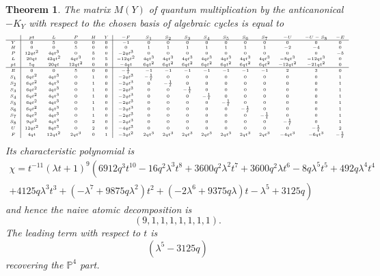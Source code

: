\documentclass[11pt]{amsart}
\theoremstyle{plain}
\newtheorem{theorem}{Theorem}[section]
\numberwithin{equation}{section}
\theoremstyle{definition}
\theoremstyle{remark}
\renewcommand{\P}{\mathbb P}
\begin{document}
\begin{theorem}\label{tTwoQuadricsP6}
The matrix $M(Y)$ of quantum multiplication by the anticanonical $-K_Y$ with respect to the chosen basis of algebraic cycles is equal to
\[
\tiny{
\begin{array}{c|ccccc|ccccccccccc}
&pt&L&P&H& Y &-F&S_{1}&S_{2}&S_{3}&S_{4}&S_{5}&S_{6}&S_{7}&-U&-U-S_{8}&-E \\ 
\hline
      Y &0&5&0&0&0&-1&0&0&0&0&0&0&0&0&0&0\\
      H &0&0&5&0&0&0&1&1&1&1&1&1&1&-2&-4&0\\
      P&12qt^{2}&4qt^{3}&0&5&0&-2qt^{3}&0&0&0&0&0&0&0&0&0&-5\\
      L&20qt&42qt^{2}&4qt^{3}&0&5&-12qt^{2}&4qt^{3}&4qt^{3}&4qt^{3}&4qt^{3}&4qt^{3}&4qt^{3}&4qt^{3}&-8qt^{3}&-12qt^{3}&0\\
      pt & 5q&20qt&12qt^{2}&0&0&-4qt&6qt^{2}&6qt^{2}&6qt^{2}&6qt^{2}&6qt^{2}&6qt^{2}&6qt^{2}&-12qt^{2}&-21qt^{2}&0\\ 
      \hline
      E &0&0&5&0&0&-\frac{1}{t}&-1&-1&-1&-1&-1&-1&-1&2&3&0\\
      S_1&6qt^{2}&4qt^{3}&0&1&0&-2qt^{3}&-\frac{1}{t}&0&0&0&0&0&0&0&0&1\\
      S_2&6qt^{2}&4qt^{3}&0&1&0&-2qt^{3}&0&-\frac{1}{t}&0&0&0&0&0&0&0&1\\
      S_3&6qt^{2}&4qt^{3}&0&1&0&-2qt^{3}&0&0&-\frac{1}{t}&0&0&0&0&0&0&1\\
      S_4&6qt^{2}&4qt^{3}&0&1&0&-2qt^{3}&0&0&0&-\frac{1}{t}&0&0&0&0&0&1\\
      S_5&6qt^{2}&4qt^{3}&0&1&0&-2qt^{3}&0&0&0&0&-\frac{1}{t}&0&0&0&0&1\\
      S_6&6qt^{2}&4qt^{3}&0&1&0&-2qt^{3}&0&0&0&0&0&-\frac{1}{t}&0&0&0&1\\
      S_7 &6qt^{2}&4qt^{3}&0&1&0&-2qt^{3}&0&0&0&0&0&0&-\frac{1}{t}&0&0&1\\
      S_8 &9qt^{2}&4qt^{3}&0&2&0&-2qt^{3}&0&0&0&0&0&0&0&-\frac{1}{t}&0&1\\
      U & 12qt^{2}&8qt^{3}&0&2&0&-4qt^{3}&0&0&0&0&0&0&0&0&-\frac{1}{t}&2\\
      F &4qt&12qt^{2}&2qt^{3}&0&1&-3qt^{2}&2qt^{3}&2qt^{3}&2qt^{3}&2qt^{3}&2qt^{3}&2qt^{3}&2qt^{3}&-4qt^{3}&-6qt^{3}&-\frac{1}{t}
      \end{array}
}
\]
Its characteristic polynomial is
\begin{gather*}
\chi = t^{-11}
\left(\lambda t+1\right)^{9}
\left(6912q^{3}t^{10}-16q^{2}\lambda^{3}t^{8}+3600q^{2}\lambda^{2}t^{7}+3600q^{2}\lambda t^{6} 
-8q\lambda^{5}t^{5}
+492q\lambda^{4}t^{4}
\right.\\\left.
+4125q\lambda^{3}t^{3} 
+\left(-\lambda^{7}+9875q\lambda^{2}\right)t^{2}
+\left(-2\lambda^{6}+9375q\lambda\right)t
-\lambda^{5}+3125q
\right) 
\end{gather*}
and hence the naive atomic decomposition is
\[
    (9,1,1,1,1,1,1,1).
\]
The leading term with respect to $t$ is
\[
 \left(\lambda^{5}-3125q\right)
\]
recovering the $\P^4$ part.
\end{theorem}
\end{document}
